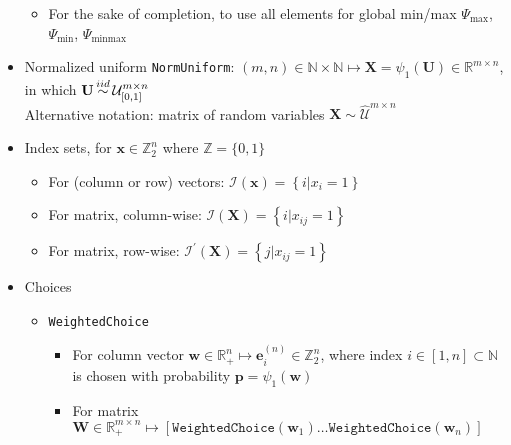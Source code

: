 \documentclass[fleqn]{article}
\newcommand\iidsim{\stackrel{\mathclap{iid}}{\sim}}
\begin{document}
\begin{itemize}
\begin{itemize}
            \item For the sake of completion,
                to use all elements for global min/max
                $\Psi_{\max}$,
                $\Psi_{\min}$,
                $\Psi_{\mathrm{minmax}}$
        \end{itemize}
    \item Normalized uniform \texttt{NormUniform}:
        $(m, n) \in \mathbb{N} \times \mathbb{N}
        \longmapsto
        \mathbf{X} = \psi_1(\mathbf{U}) \in \mathbb{R}^{m \times n}
        $, in which
        $\mathbf{U} \iidsim \mathcal{U}_{[0,1]}^{m \times n}$ \\
        Alternative notation: matrix of random variables
        $\mathbf{X} \sim \widehat{\mathcal{U}}^{m \times n}$
    \item Index sets, for $\mathbf{x} \in \mathbb{Z}^n_2$ where $\mathbb{Z} = \{0,1\}$
        \begin{itemize}
            \item For (column or row) vectors: $\mathcal{I}(\mathbf{x}) = \left\{i | x_{i} = 1\right\}$
            \item For matrix, column-wise:
                $\mathcal{I}(\mathbf{X}) = \left\{i | x_{ij} = 1\right\}$
            \item For matrix, row-wise:
                $\mathcal{I}^{\prime}(\mathbf{X}) = \left\{j | x_{ij} = 1\right\}$
        \end{itemize}
    \item Choices
        \begin{itemize}
            \item \texttt{WeightedChoice}
                \begin{itemize}
                    \item For column vector
                        $\mathbf{w} \in \mathbb{R}^{n}_{+} \longmapsto
                        \mathbf{e}^{(n)}_i \in \mathbb{Z}_2^n$,
                        where index $i \in [1, n] \subset \mathbb{N}$
                        is chosen with probability $\mathbf{p} = \psi_1(\mathbf{w})$
                    \item For matrix
                        $\mathbf{W} \in \mathbb{R}^{m \times n}_{+} \longmapsto
                        \left[
                            \texttt{WeightedChoice}(\mathbf{w}_1)
                            \dots
                            \texttt{WeightedChoice}(\mathbf{w}_n)
                        \right]
                        $
                \end{itemize}

\end{itemize}
\end{itemize}
\end{document}

